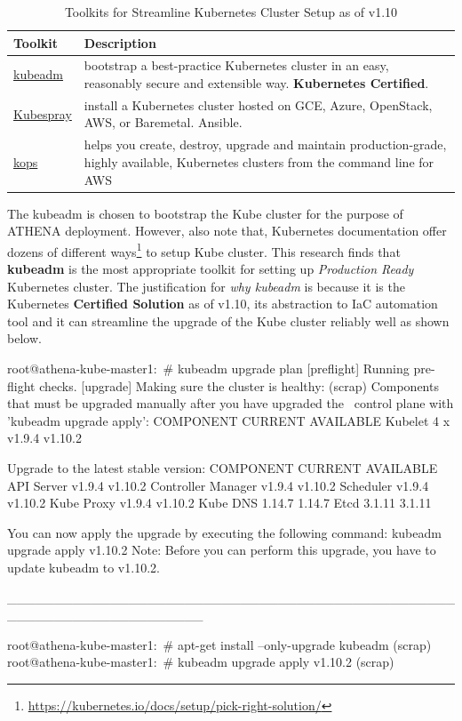 \begin{table}[H]
\centering
    \begin{tabular}{ | l | p{12cm} |}
    \hline
    Toolkit & Description \\ \hline
    \href{https://kubernetes.io/docs/setup/independent/create-cluster-kubeadm/}{kubeadm} & bootstrap a best-practice Kubernetes cluster in an easy, reasonably secure and extensible way. \textbf{Kubernetes Certified}. \\ \hline
    \href{https://github.com/kubernetes-incubator/kubespray}{Kubespray} & install a Kubernetes cluster hosted on GCE, Azure, OpenStack, AWS, or Baremetal. Ansible. \\  \hline
    \href{https://github.com/kubernetes/kops}{kops} & helps you create, destroy, upgrade and maintain production-grade, highly available, Kubernetes clusters from the command line for AWS \\
    \hline
    \end{tabular}
\caption{Toolkits for Streamline Kubernetes Cluster Setup as of v1.10}
\label{kubeToolkits}
\end{table}

The kubeadm is chosen to bootstrap the Kube cluster for the purpose of ATHENA deployment. However, also note that, Kubernetes documentation offer dozens of different ways\footnote{\url{https://kubernetes.io/docs/setup/pick-right-solution/}} to setup Kube cluster. This research finds that \textbf{kubeadm} is the most appropriate toolkit for setting up \emph{Production Ready} Kubernetes cluster. The justification for \emph{why kubeadm} is because it is the Kubernetes \textbf{Certified Solution} as of v1.10, its abstraction to IaC automation tool and it can streamline the upgrade of the Kube cluster reliably well as shown below.

\begin{small}
\begin{lcverbatim}
root@athena-kube-master1:~# kubeadm upgrade plan
[preflight] Running pre-flight checks.
[upgrade] Making sure the cluster is healthy:
(scrap)
Components that must be upgraded manually after you have upgraded the \
   control plane with 'kubeadm upgrade apply':
COMPONENT   CURRENT      AVAILABLE
Kubelet     4 x v1.9.4   v1.10.2

Upgrade to the latest stable version:
COMPONENT            CURRENT   AVAILABLE
API Server           v1.9.4    v1.10.2
Controller Manager   v1.9.4    v1.10.2
Scheduler            v1.9.4    v1.10.2
Kube Proxy           v1.9.4    v1.10.2
Kube DNS             1.14.7    1.14.7
Etcd                 3.1.11    3.1.11

You can now apply the upgrade by executing the following command:
	kubeadm upgrade apply v1.10.2
Note: Before you can perform this upgrade, you have to update kubeadm to v1.10.2.

_____________________________________________________________________

root@athena-kube-master1:~# apt-get install --only-upgrade kubeadm
(scrap)
root@athena-kube-master1:~# kubeadm upgrade apply v1.10.2
(scrap)
\end{lcverbatim}
\end{small}

